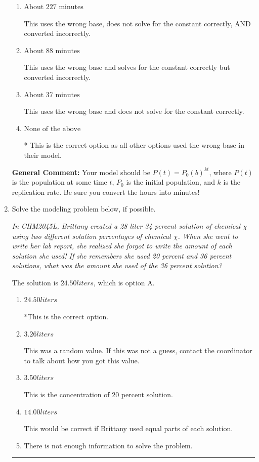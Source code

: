 \documentclass{extbook}[14pt]
\newcommand{\litem}[1]{\item #1

\rule{\textwidth}{0.4pt}}
\begin{document}
\begin{enumerate}
{\begin{enumerate}[label=\Alph*.]
This uses the wrong base.
\item \( \text{About } 227 \text{ minutes} \)

This uses the wrong base, does not solve for the constant correctly, AND converted incorrectly.
\item \( \text{About } 88 \text{ minutes} \)

This uses the wrong base and solves for the constant correctly but converted incorrectly.
\item \( \text{About } 37 \text{ minutes} \)

This uses the wrong base and does not solve for the constant correctly.
\item \( \text{None of the above} \)

* This is the correct option as all other options used the wrong base in their model.
\end{enumerate}

\textbf{General Comment:} Your model should be $P(t) = P_0(b)^{kt}$, where $P(t)$ is the population at some time $t$, $P_0$ is the initial population, and $k$ is the replication rate. Be sure you convert the hours into minutes!
}
\litem{
Solve the modeling problem below, if possible.

\begin{center}
    \textit{ In CHM2045L, Brittany created a 28 liter 34 percent solution of chemical $\chi$ using two different solution percentages of chemical $\chi$. When she went to write her lab report, she realized she forgot to write the amount of each solution she used! If she remembers she used 20 percent and 36 percent solutions, what was the amount she used of the 36 percent solution? }
\end{center}
The solution is \( 24.50 liters \), which is option A.\begin{enumerate}[label=\Alph*.]
\item \( 24.50 liters \)

*This is the correct option.
\item \( 3.26 liters \)

This was a random value. If this was not a guess, contact the coordinator to talk about how you got this value.
\item \( 3.50 liters \)

This is the concentration of 20 percent solution.
\item \( 14.00 liters \)

This would be correct if Brittany used equal parts of each solution.
\item \( \text{There is not enough information to solve the problem.} \)


\end{enumerate}}
\end{enumerate}
\end{document}
